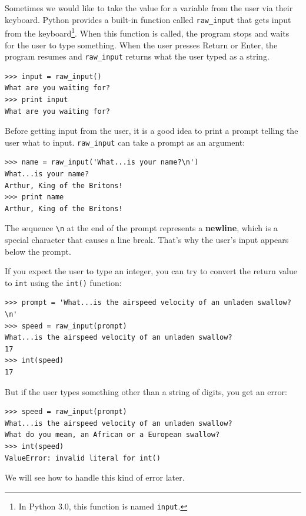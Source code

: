 \documentclass[10pt]{book}
\begin{document}
Sometimes we would like to take the value for a variable from the user
via their keyboard.
Python provides a built-in function called \verb"raw_input" that gets
input from the keyboard\footnote{In Python 3.0, this function is named
  {\tt input}.}.  When this function is called, the program stops and
waits for the user to type something.  When the user presses {\sf
  Return} or {\sf Enter}, the program resumes and \verb"raw_input"
returns what the user typed as a string.


\beforeverb
\begin{verbatim}
>>> input = raw_input()
What are you waiting for?
>>> print input
What are you waiting for?
\end{verbatim}
\afterverb
%
Before getting input from the user, it is a good idea to print a
prompt telling the user what to input.  \verb"raw_input" can take a
prompt as an argument:


\beforeverb
\begin{verbatim}
>>> name = raw_input('What...is your name?\n')
What...is your name?
Arthur, King of the Britons!
>>> print name
Arthur, King of the Britons!
\end{verbatim}
\afterverb
%
The sequence \verb"\n" at the end of the prompt represents a {\bf newline},
which is a special character that causes a line break.
That's why the user's input appears below the prompt.


If you expect the user to type an integer, you can try to convert
the return value to {\tt int} using the {\tt int()} function:

\beforeverb
\begin{verbatim}
>>> prompt = 'What...is the airspeed velocity of an unladen swallow?\n'
>>> speed = raw_input(prompt)
What...is the airspeed velocity of an unladen swallow?
17
>>> int(speed)
17
\end{verbatim}
\afterverb
%
But if the user types something other than a string of digits,
you get an error:

\beforeverb
\begin{verbatim}
>>> speed = raw_input(prompt)
What...is the airspeed velocity of an unladen swallow?
What do you mean, an African or a European swallow?
>>> int(speed)
ValueError: invalid literal for int()
\end{verbatim}
\afterverb
%
We will see how to handle this kind of error later.
\end{document}
